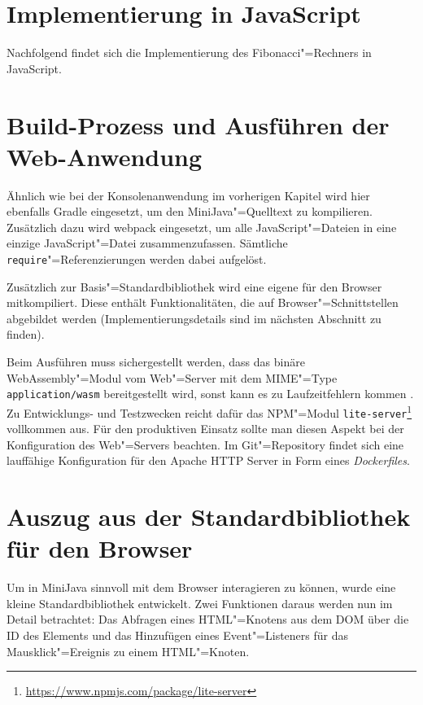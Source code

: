 \section{Implementierung in JavaScript}

Nachfolgend findet sich die Implementierung des Fibonacci"=Rechners in JavaScript.


\section{Build-Prozess und Ausführen der Web-Anwendung}

Ähnlich wie bei der Konsolenanwendung im vorherigen Kapitel wird hier ebenfalls Gradle eingesetzt, um den MiniJava"=Quelltext zu kompilieren. Zusätzlich dazu wird webpack \cite{Webpack} eingesetzt, um alle JavaScript"=Dateien in eine einzige JavaScript"=Datei zusammenzufassen. Sämtliche \lstinline{require}"=Referenzierungen werden dabei aufgelöst.

Zusätzlich zur Basis"=Standardbibliothek wird eine eigene für den Browser mitkompiliert. Diese enthält Funktionalitäten, die auf Browser"=Schnittstellen abgebildet werden (Implementierungsdetails sind im nächsten Abschnitt zu finden).

Beim Ausführen muss sichergestellt werden, dass das binäre WebAssembly"=Modul vom Web"=Server mit dem MIME"=Type \lstinline{application/wasm} bereitgestellt wird, sonst kann es zu Laufzeitfehlern kommen \cite{MDNWebAssembly}. Zu Entwicklungs- und Testzwecken reicht dafür das NPM"=Modul \lstinline{lite-server}\footnote{\url{https://www.npmjs.com/package/lite-server}} vollkommen aus. Für den produktiven Einsatz sollte man diesen Aspekt bei der Konfiguration des Web"=Servers beachten. Im Git"=Repository findet sich eine lauffähige Konfiguration für den Apache HTTP Server in Form eines \emph{Dockerfiles}.

\section{Auszug aus der Standardbibliothek für den Browser}

Um in MiniJava sinnvoll mit dem Browser interagieren zu können, wurde eine kleine Standardbibliothek entwickelt. Zwei Funktionen daraus werden nun im Detail betrachtet: Das Abfragen eines HTML"=Knotens aus dem DOM über die ID des Elements und das Hinzufügen eines Event"=Listeners für das Mausklick"=Ereignis zu einem HTML"=Knoten.

